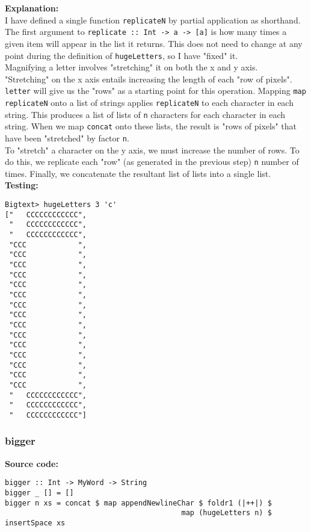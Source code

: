 \documentclass[11pt]{article}
\begin{document}
{\textbf{Explanation:}\\
I have defined a single function {\verb|replicateN|} by partial application as shorthand. The first argument to {\verb|replicate :: Int -> a -> [a]|} is how many times a given item will appear in the list it returns. This does not need to change at any point during the definition of {\verb|hugeLetters|}, so I have "fixed" it. \\

Magnifying a letter involves "stretching" it on both the x and y axis. \\ 

"Stretching" on the x axis entails increasing the length of each "row of pixels". {\verb|letter|} will give us the "rows" as a starting point for this operation. Mapping {\verb|map replicateN|} onto a list of strings applies {\verb|replicateN|} to each character in each string. This produces a list of lists of {\verb|n|} characters for each character in each string. When we map {\verb|concat|} onto these lists, the result is "rows of pixels" that have been "stretched" by factor {\verb|n|}.\\

To "stretch" a character on the y axis, we must increase the number of rows. To do this, we replicate each "row" (as generated in the previous step) {\verb|n|} number of times. Finally, we concatenate the resultant list of lists into a single list.\\

\newpage
\textbf{Testing:}
\begin{verbatim}
Bigtext> hugeLetters 3 'c'
["   CCCCCCCCCCCC",
 "   CCCCCCCCCCCC",
 "   CCCCCCCCCCCC",
 "CCC            ",
 "CCC            ",
 "CCC            ",
 "CCC            ",
 "CCC            ",
 "CCC            ",
 "CCC            ",
 "CCC            ",
 "CCC            ",
 "CCC            ",
 "CCC            ",
 "CCC            ",
 "CCC            ",
 "CCC            ",
 "CCC            ",
 "   CCCCCCCCCCCC",
 "   CCCCCCCCCCCC",
 "   CCCCCCCCCCCC"]
\end{verbatim}

\subsubsection{bigger}
\textbf{Source code:}
\begin{verbatim}
bigger :: Int -> MyWord -> String
bigger _ [] = []                                                                                    
bigger n xs = concat $ map appendNewlineChar $ foldr1 (|++|) $ 
                                         map (hugeLetters n) $ insertSpace xs
\end{verbatim}

}
\end{document}
